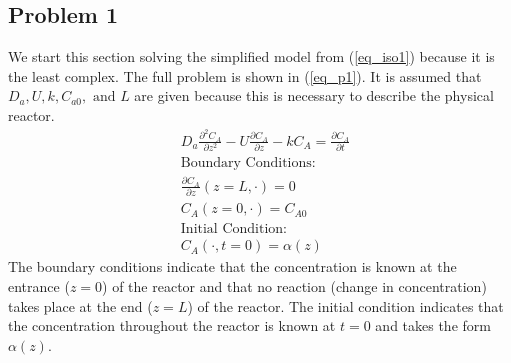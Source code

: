 \documentclass[11pt,fleqn]{article}
\theoremstyle{defstyle}
\begin{document}
\subsection{Problem 1}
We start this section solving the simplified model from (\ref{eq_iso1}) because it is the least complex. The full problem is shown in (\ref{eq_p1}). It is assumed that $D_a, U, k, C_{a0},\text{ and } L$ are given because this is necessary to describe the physical reactor.  
\begin{equation}
\begin{aligned}
&D_a \frac{\partial^2 C_A}{\partial z^2} - U \frac{\partial C_A}{\partial z} - kC_A = 
\frac{\partial C_A}{\partial t} \\
&\text{Boundary Conditions:} \\
&\frac{\partial C_A}{\partial z}(z=L, \cdot) = 0\\
&C_A(z=0, \cdot) = C_{A0} \\
&\text{Initial Condition:} \\
& C_A(\cdot, t= 0) = \alpha(z)
\end{aligned}
\label{eq_p1}
\end{equation}
The boundary conditions indicate that the concentration is known at the entrance ($z=0$) of the reactor and that no reaction (change in concentration) takes place at the end ($z=L$) of the reactor. The initial condition indicates that the concentration throughout the reactor is known at $t=0$ and takes the form $\alpha(z)$. 
\end{document}
